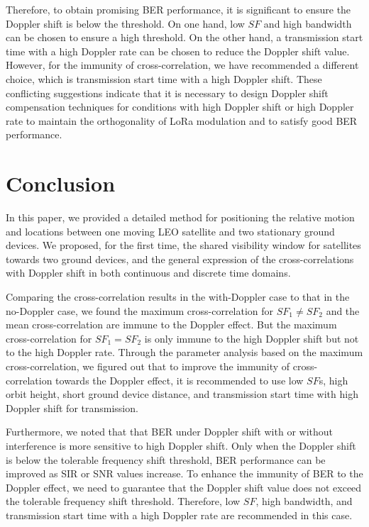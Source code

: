 \documentclass{IEEEtaes}
\theoremstyle{plain}
\begin{document}
Therefore, to obtain promising BER performance, it is significant to ensure the Doppler shift is below the threshold. On one hand, low $SF$ and high bandwidth can be chosen to ensure a high threshold. On the other hand, a transmission start time with a high Doppler rate can be chosen to reduce the Doppler shift value. However, for the immunity of cross-correlation, we have recommended a different choice, which is transmission start time with a high Doppler shift. These conflicting suggestions indicate that it is necessary to design Doppler shift compensation techniques for conditions with high Doppler shift or high Doppler rate to maintain the orthogonality of LoRa modulation and to satisfy good BER performance. 

\section{Conclusion} \label{conclusion}
In this paper, we provided a detailed method for positioning the relative motion and locations between one moving LEO satellite and two stationary ground devices. We proposed, for the first time, the shared visibility window for satellites towards two ground devices, and the general expression of the cross-correlations with Doppler shift in both continuous and discrete time domains. 

Comparing the cross-correlation results in the with-Doppler case to that in the no-Doppler case, we found the maximum cross-correlation for $SF_1 \!\neq\! SF_2$ and the mean cross-correlation are immune to the Doppler effect. But the maximum cross-correlation for $SF_1\!=\!SF_2$ is only immune to the high Doppler shift but not to the high Doppler rate. 
Through the parameter analysis based on the maximum cross-correlation, we figured out that to improve the immunity of cross-correlation towards the Doppler effect, it is recommended to use low $SF$s, high orbit height, short ground device distance, and transmission start time with high Doppler shift for transmission. 

Furthermore, we noted that that BER under Doppler shift with or without interference is more sensitive to high Doppler shift. Only when the Doppler shift is below the tolerable frequency shift threshold, BER performance can be improved as SIR or SNR values increase. To enhance the immunity of BER to the Doppler effect, we need to guarantee that the Doppler shift value does not exceed the tolerable frequency shift threshold. Therefore, low $SF$, high bandwidth, and transmission start time with a high Doppler rate are recommended in this case. 
\end{document}
